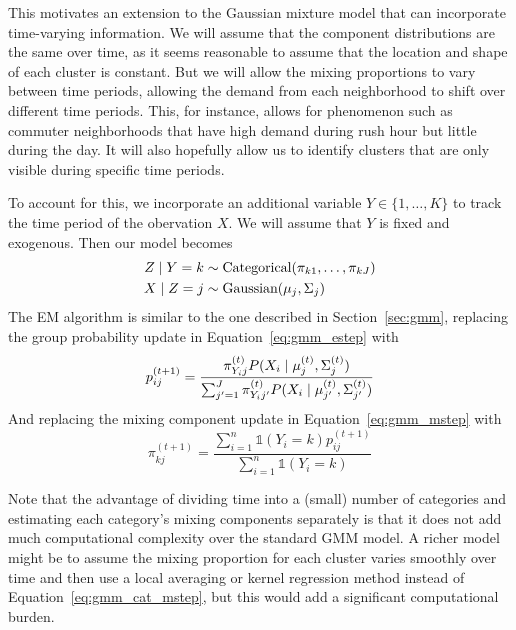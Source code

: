 \documentclass[12pt]{article}
\newcommand*{\I}{\mathds{1}}
\newcommand*{\cond}{\;\ifnum\currentgrouptype=16 \middle\fi|\;}
\newcommand*{\dist}{\sim}
\newcommand*{\mt}[1]{\text{\normalfont #1}}
\theoremstyle{definition}
\theoremstyle{algodesc}
\begin{document}
This motivates an extension to the Gaussian mixture model that can incorporate time-varying information. We will assume that the component distributions are the same over time, as it seems reasonable to assume that the location and shape of each cluster is constant. But we will allow the mixing proportions to vary between time periods, allowing the demand from each neighborhood to shift over different time periods. This, for instance, allows for phenomenon such as commuter neighborhoods that have high demand during rush hour but little during the day. It will also hopefully allow us to identify clusters that are only visible during specific time periods.

To account for this, we incorporate an additional variable $Y \in \{1, \dots, K\}$ to track the time period of the obervation $X$. We will assume that $Y$ is fixed and exogenous. Then our model becomes
\begin{equation} \label{eq:gmm_cat}
\begin{aligned}
Z \cond Y = k &\dist \mt{Categorical}(\pi_{k1}, \dots, \pi_{kJ}) \\
X \cond Z = j &\dist \mt{Gaussian}(\mu_j, \Sigma_j)
\end{aligned}
\end{equation}
The EM algorithm is similar to the one described in Section~\ref{sec:gmm}, replacing the group probability update in Equation~\ref{eq:gmm_estep} with
\begin{equation} \label{eq:gmm_cat_estep}
p_{ij}^{(t+1)} = \frac{\pi_{Y_i j}^{(t)} P( X_i \cond \mu_j^{(t)}, \Sigma_j^{(t)})}{\sum_{j'=1}^J \pi_{Y_i j'}^{(t)} P( X_i \cond \mu_{j'}^{(t)}, \Sigma_{j'}^{(t)})}
\end{equation}
And replacing the mixing component update in Equation~\ref{eq:gmm_mstep} with
\begin{equation} \label{eq:gmm_cat_mstep}
\pi_{kj}^{(t+1)} = \frac{\sum_{i=1}^n \I(Y_i = k) p_{ij}^{(t+1)} }{\sum_{i=1}^n \I(Y_i = k)}
\end{equation}

Note that the advantage of dividing time into a (small) number of categories and estimating each category's mixing components separately is that it does not add much computational complexity over the standard GMM model. A richer model might be to assume the mixing proportion for each cluster varies smoothly over time and then use a local averaging or kernel regression method instead of Equation~\ref{eq:gmm_cat_mstep}, but this would add a significant computational burden.
\end{document}
